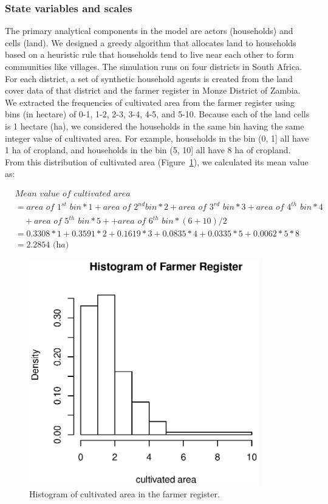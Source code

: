 \documentclass[12pt, titlepage]{article}
\begin{document}
\subsubsection{State variables and scales} 
The primary analytical components in the model are actors (households) and cells (land). We designed a greedy algorithm that allocates land to households based on a heuristic rule that households tend to live near each other to form communities like villages. The simulation runs on four districts in South Africa. For each district, a set of synthetic household agents is created from the land cover data of that district and the farmer register in Monze District of Zambia. We extracted the frequencies of cultivated area from the farmer register using bins (in hectare) of 0-1, 1-2, 2-3, 3-4, 4-5, and 5-10. Because each of the land cells is 1 hectare (ha), we considered the households in the same bin having the same integer value of cultivated area. For example, households in the bin (0, 1] all have 1 ha of cropland, and households in the bin (5, 10] all have 8 ha of cropland. From this distribution of cultivated area (Figure~\ref{fig:histo}), we calculated its mean value as:

\begin{displaymath} 
\begin{split} & \textit{Mean value of cultivated area} \\ 
& = \textit{area of 1}^{st}\textit{ bin} * 1 + \textit{area of 2}^{nd}\textit{bin} * 2 + \textit{area of 3}^{rd}\textit{ bin} * 3 + \textit{area of 4}^{th}\textit{ bin} * 4 \\ 
& \quad  + \textit{area of 5}^{th}\textit{ bin} * 5 + + \textit{area of 6}^{th}\textit{ bin} * (6 + 10)/2 \\ & = 0.3308 *1 + 0.3591 * 2 + 0.1619 * 3 + 0.0835 * 4 + 0.0335 * 5 + 0.0062 * 5 * 8 \\ 
& = 2.2854 \textit{ (ha)} 
\end{split}
\end{displaymath}

\begin{figure}[!ht] 
\centering 
\includegraphics[width = 10cm]{figures/histogram.eps} 
\caption{Histogram of cultivated area in the farmer register. } 
\label{fig:histo} 
\end{figure}
\end{document}
